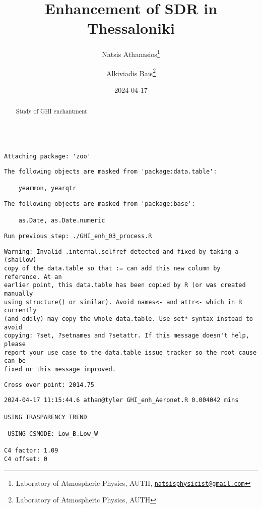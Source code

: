 \documentclass[
  10pt,
  a4paper,oneside]{article}
\title{Enhancement of SDR in Thessaloniki}
\author{Natsis Athanasios\footnote{Laboratory of Atmospheric Physics, AUTH, \href{mailto:natsisphysicist@gmail.com}{\nolinkurl{natsisphysicist@gmail.com}}} \and Alkiviadis Bais\footnote{Laboratory of Atmospheric Physics, AUTH}}
\date{2024-04-17}
\begin{document}
\maketitle
\begin{abstract}
Study of GHI enchantment.
\end{abstract}

{
\hypersetup{linkcolor=}
\setcounter{tocdepth}{4}
\tableofcontents
}
\begin{verbatim}

Attaching package: 'zoo'
\end{verbatim}

\begin{verbatim}
The following objects are masked from 'package:data.table':

    yearmon, yearqtr
\end{verbatim}

\begin{verbatim}
The following objects are masked from 'package:base':

    as.Date, as.Date.numeric
\end{verbatim}

\begin{verbatim}
Run previous step: ./GHI_enh_03_process.R
\end{verbatim}

\begin{verbatim}
Warning: Invalid .internal.selfref detected and fixed by taking a (shallow)
copy of the data.table so that := can add this new column by reference. At an
earlier point, this data.table has been copied by R (or was created manually
using structure() or similar). Avoid names<- and attr<- which in R currently
(and oddly) may copy the whole data.table. Use set* syntax instead to avoid
copying: ?set, ?setnames and ?setattr. If this message doesn't help, please
report your use case to the data.table issue tracker so the root cause can be
fixed or this message improved.
\end{verbatim}

\begin{verbatim}
Cross over point: 2014.75 
\end{verbatim}

\begin{verbatim}
2024-04-17 11:15:44.6 athan@tyler GHI_enh_Aeronet.R 0.004042 mins

USING TRASPARENCY TREND

 USING CSMODE: Low_B.Low_W 

C4 factor: 1.09 
C4 offset: 0 
\end{verbatim}
\end{document}
